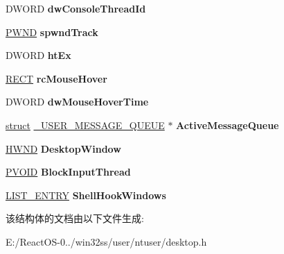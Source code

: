 \begin{DoxyCompactItemize}
\item 
\mbox{\label{struct___d_e_s_k_t_o_p_a7918275e205a7cd55d395b0751d70273}} 
D\+W\+O\+RD {\bfseries dw\+Console\+Thread\+Id}
\item 
\mbox{\label{struct___d_e_s_k_t_o_p_a73d8152e5dc0b69c733d5070ebd4daf9}} 
\hyperlink{struct___w_n_d}{P\+W\+ND} {\bfseries spwnd\+Track}
\item 
\mbox{\label{struct___d_e_s_k_t_o_p_abc1f7d56f54194ac76d5775a3eced09f}} 
D\+W\+O\+RD {\bfseries ht\+Ex}
\item 
\mbox{\label{struct___d_e_s_k_t_o_p_ad2b331b655333f13289e805cf9713cb5}} 
\hyperlink{structtag_r_e_c_t}{R\+E\+CT} {\bfseries rc\+Mouse\+Hover}
\item 
\mbox{\label{struct___d_e_s_k_t_o_p_a3efff8a1d5a5335f06f1365ba362adba}} 
D\+W\+O\+RD {\bfseries dw\+Mouse\+Hover\+Time}
\item 
\mbox{\label{struct___d_e_s_k_t_o_p_a4327ff6ad371e8ae1a4391430e92a8db}} 
\hyperlink{interfacestruct}{struct} \hyperlink{struct___u_s_e_r___m_e_s_s_a_g_e___q_u_e_u_e}{\+\_\+\+U\+S\+E\+R\+\_\+\+M\+E\+S\+S\+A\+G\+E\+\_\+\+Q\+U\+E\+UE} $\ast$ {\bfseries Active\+Message\+Queue}
\item 
\mbox{\label{struct___d_e_s_k_t_o_p_ac9cbe72119d9ca2c157b5b92ca645de0}} 
\hyperlink{interfacevoid}{H\+W\+ND} {\bfseries Desktop\+Window}
\item 
\mbox{\label{struct___d_e_s_k_t_o_p_a1403d912c1f61d2d84a366d565c9e7bf}} 
\hyperlink{interfacevoid}{P\+V\+O\+ID} {\bfseries Block\+Input\+Thread}
\item 
\mbox{\label{struct___d_e_s_k_t_o_p_a710002a758d759ab9b982956c8800027}} 
\hyperlink{struct___l_i_s_t___e_n_t_r_y}{L\+I\+S\+T\+\_\+\+E\+N\+T\+RY} {\bfseries Shell\+Hook\+Windows}
\end{DoxyCompactItemize}


该结构体的文档由以下文件生成\+:\begin{DoxyCompactItemize}
\item 
E\+:/\+React\+O\+S-\/0../win32ss/user/ntuser/desktop.\+h\end{DoxyCompactItemize}

